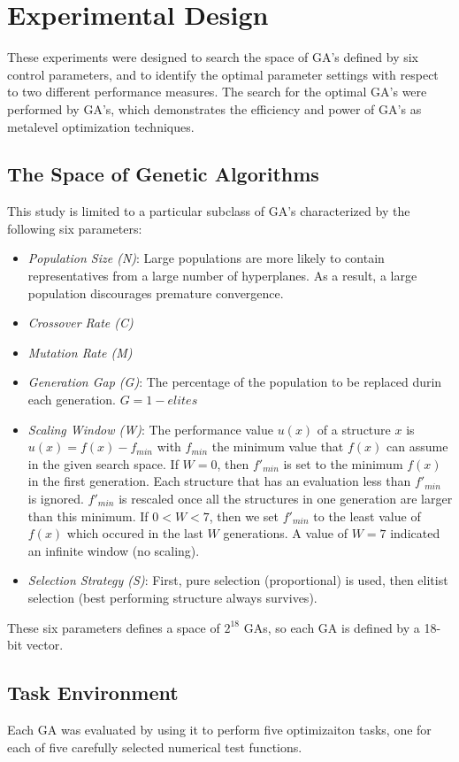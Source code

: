 \documentclass[12pt]{book}
\begin{document}
\section{Experimental Design}
These experiments were designed to search the space of GA's defined by six control parameters, and to identify the optimal parameter settings with respect to two different performance measures. The search for the optimal GA's were performed by GA's, which demonstrates the efficiency and power of GA's as metalevel optimization techniques.

\subsection{The Space of Genetic Algorithms}
This study is limited to a particular subclass of GA's characterized by the following six parameters:
\begin{itemize}
\item \textit{Population Size (N)}: Large populations are more likely to contain representatives from a large number of hyperplanes. As a result, a large population discourages premature convergence.
\item \textit{Crossover Rate (C)}
\item \textit{Mutation Rate (M)}
\item \textit{Generation Gap (G)}: The percentage of the population to be replaced durin each generation. $G = 1 - elites$
\item \textit{Scaling Window (W)}: The performance value $u(x)$ of a structure $x$ is $u(x) = f(x) - f_{min}$ with $f_{min}$ the minimum value that $f(x)$ can assume in the given search space. If $W = 0$, then $f'_{min}$ is set to the minimum $f(x)$ in the first generation. Each structure that has an evaluation less than $f'_{min}$ is ignored. $f'_{min}$ is rescaled once all the structures in one generation are larger than this minimum. If $0 < W < 7$, then we set $f'_{min}$ to the least value of $f(x)$ which occured in the last $W$ generations. A value of $W = 7$ indicated an infinite window (no scaling).
\item \textit{Selection Strategy (S)}: First, pure selection (proportional) is used, then elitist selection (best performing structure always survives).
\end{itemize}
These six parameters defines a space of $2^{18}$ GAs, so each GA is defined by a 18-bit vector.

\subsection{Task Environment}
Each GA was evaluated by using it to perform five optimizaiton tasks, one for each of five carefully selected numerical test functions.
\end{document}
